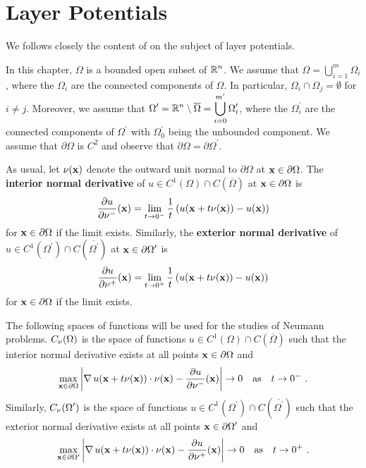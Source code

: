 \section{Layer Potentials} \label{potential_sect}

We follows closely the content of \cite{FoPDE} on
the subject of layer potentials.

In this chapter, $\Omega$ is a bounded open subset of $\displaystyle \mathbb{R}^n$.  We
assume that $\displaystyle \Omega = \bigcup_{i=1}^{m} \Omega_i$, where the
$\Omega_i$ are the connected components of $\Omega$.  In particular,
$\Omega_i \cap \Omega_j = \emptyset$ for $i\neq j$.  Moreover, we
assume that $\displaystyle \Omega^\prime = \mathbb{R}^n \setminus \overline{\Omega}
= \bigcup_{i=0}^{m^{\prime}} \Omega_i^{\prime}$,
where the $\displaystyle \Omega_i^{\prime}$ are the connected components of
$\displaystyle \Omega^{\prime}$ with
$\displaystyle \Omega_0^{\prime}$ being the unbounded component.
We assume that $\partial \Omega$ is $\displaystyle C^2$ and observe that
$\displaystyle \partial \Omega = \partial \Omega^{\prime}$.

As usual, let $\mathbf{\nu}(\mathbf{x})$ denote the outward unit normal to
$\partial \Omega$ at $\mathbf{x} \in \partial \Omega$.  The
{\bfseries interior normal derivative} of
$\displaystyle u \in C^1(\Omega) \cap C(\overline{\Omega})$ at
$\mathbf{x} \in \partial \Omega$ is
\[
\frac{\partial{u}}{\partial \mathbf{\nu}^-}(\mathbf{x})
= \lim_{t\rightarrow 0^-} \frac{1}{t}
\left( u(\mathbf{x} + t \mathbf{\nu}(\mathbf{x})) - u(\mathbf{x})\right)
\]
for $\mathbf{x} \in \partial \Omega$ if the limit exists.  Similarly, the
{\bfseries exterior normal derivative} of
$\displaystyle u \in C^1(\Omega^{\prime}) \cap C(\overline{\Omega^{\prime}})$ at
$\displaystyle \mathbf{x} \in \partial \Omega^{\prime}$ is
\[
\frac{\partial{u}}{\partial \mathbf{\nu}^+}(\mathbf{x})
= \lim_{t\rightarrow 0^+} \frac{1}{t}
\left( u(\mathbf{x} + t \mathbf{\nu}(\mathbf{x})) - u(\mathbf{x}) \right)
\]
for $\mathbf{x} \in \partial \Omega$ if the limit exists.

The following spaces of functions will be used for the studies of
Neumann problems. $C_{\mathbf{\nu}}(\Omega)$ is the space of functions
$\displaystyle u \in C^1(\Omega) \cap C(\overline{\Omega})$ such that the
interior normal derivative exists at all points
$\mathbf{x} \in \partial \Omega$ and
\begin{equation} \label{pot_unif_ddn}
\max_{\mathbf{x}\in \partial \Omega}
\left| \operatorname{\nabla} u(\mathbf{x} + t \mathbf{\nu}(\mathbf{x})) \cdot \mathbf{\nu}(\mathbf{x})
- \frac{\partial{u}}{\partial \mathbf{\nu}^-}(\mathbf{x}) \right| \rightarrow 0 \quad
\text{as} \quad t \rightarrow 0^- \ .
\end{equation}
Similarly, $\displaystyle C_{\mathbf{\nu}}(\Omega^{\prime})$ is the space
of functions
$\displaystyle u \in C^1(\Omega^{\prime}) \cap C(\overline{\Omega^{\prime}})$
such that the exterior normal derivative exists at all points
$\displaystyle \mathbf{x} \in \partial \Omega^{\prime}$ and
\begin{equation} \label{pot_ddn_unif}
\max_{\mathbf{x}\in \partial \Omega^{\prime}}
\left| \operatorname{\nabla} u(\mathbf{x} + t \mathbf{\nu}(\mathbf{x})) \cdot \mathbf{\nu}(\mathbf{x})
- \frac{\partial{u}}{\partial \mathbf{\nu}^+}(\mathbf{x}) \right| \rightarrow 0 \quad
\text{as} \quad t \rightarrow 0^+ \ .
\end{equation}

